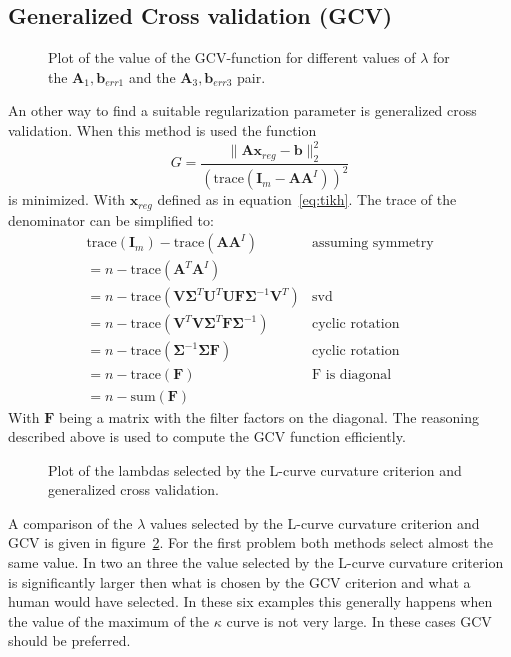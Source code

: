 \subsection{Generalized Cross validation (GCV)}
\begin{figure}
\centering


\caption{Plot of the value of the GCV-function for different values of $\lambda$ for the $\mathbf{A}_1, \mathbf{b}_{err1}$ and the $\mathbf{A}_3, \mathbf{b}_{err3}$ pair.}
\label{fig:GCVA1}
\end{figure}
An other way to find a suitable regularization parameter is generalized cross validation. When this method is used the function
\begin{equation}
G = \frac{\| \mathbf{Ax}_{reg} - \mathbf{b} \|^2_2}{(\text{trace}(\mathbf{I}_m - \mathbf{AA}^I))^2}
\end{equation}
is minimized. With $\mathbf{x}_{reg}$ defined as in equation~\ref{eq:tikh}. The trace of the denominator can be simplified to:
\begin{eqnarray}
\text{trace}(\mathbf{I}_m) - \text{trace}(\mathbf{AA}^I) & \text{assuming symmetry} \\
= n - \text{trace}(\mathbf{A}^T \mathbf{A}^I) \\
= n - \text{trace}(\mathbf{V}\mathbf{\Sigma}^T \mathbf{U}^T \mathbf{U}\mathbf{F}\mathbf{\Sigma}^{-1} \mathbf{V}^T) & \text{svd} \\
= n - \text{trace}(\mathbf{V}^T \mathbf{V}\mathbf{\Sigma}^T \mathbf{F}\mathbf{\Sigma}^{-1} ) & \text{cyclic rotation} \\
= n - \text{trace}(\mathbf{\Sigma}^{-1}\mathbf{\Sigma} \mathbf{F} ) & \text{cyclic rotation} \\
= n - \text{trace}(\mathbf{F} ) & \text{F is diagonal}  \\
= n - \text{sum}(\mathbf{F})
\end{eqnarray}
With $\mathbf{F}$ being a matrix with the filter factors on the diagonal. The reasoning described above is used to compute the GCV function efficiently.
\begin{figure}
\centering

\caption{Plot of the lambdas selected by the L-curve curvature criterion and generalized cross validation.}
\label{fig:comparisonLGCV}
\end{figure}
A comparison of the $\lambda$ values selected by the L-curve curvature criterion and GCV is given in figure~\ref{fig:comparisonLGCV}. For the first problem both methods select almost the same value. In two an three the value selected by the L-curve curvature criterion is significantly larger then what is chosen by the GCV criterion and what a human would have selected. In these six examples this generally happens when the value of the maximum of the $\kappa$ curve is not very large. In these cases GCV should be preferred.

